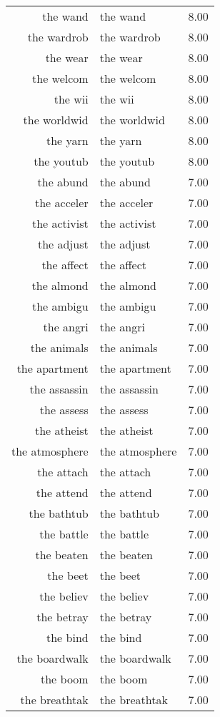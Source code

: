 \begin{table}[ht]
\begin{tabular}{rlr}
  the wand & the wand & 8.00 \\ 
  the wardrob & the wardrob & 8.00 \\ 
  the wear & the wear & 8.00 \\ 
  the welcom & the welcom & 8.00 \\ 
  the wii & the wii & 8.00 \\ 
  the worldwid & the worldwid & 8.00 \\ 
  the yarn & the yarn & 8.00 \\ 
  the youtub & the youtub & 8.00 \\ 
  the abund & the abund & 7.00 \\ 
  the acceler & the acceler & 7.00 \\ 
  the activist & the activist & 7.00 \\ 
  the adjust & the adjust & 7.00 \\ 
  the affect & the affect & 7.00 \\ 
  the almond & the almond & 7.00 \\ 
  the ambigu & the ambigu & 7.00 \\ 
  the angri & the angri & 7.00 \\ 
  the animals & the animals & 7.00 \\ 
  the apartment & the apartment & 7.00 \\ 
  the assassin & the assassin & 7.00 \\ 
  the assess & the assess & 7.00 \\ 
  the atheist & the atheist & 7.00 \\ 
  the atmosphere & the atmosphere & 7.00 \\ 
  the attach & the attach & 7.00 \\ 
  the attend & the attend & 7.00 \\ 
  the bathtub & the bathtub & 7.00 \\ 
  the battle & the battle & 7.00 \\ 
  the beaten & the beaten & 7.00 \\ 
  the beet & the beet & 7.00 \\ 
  the believ & the believ & 7.00 \\ 
  the betray & the betray & 7.00 \\ 
  the bind & the bind & 7.00 \\ 
  the boardwalk & the boardwalk & 7.00 \\ 
  the boom & the boom & 7.00 \\ 
  the breathtak & the breathtak & 7.00 \\ 

\end{tabular}
\end{table}
